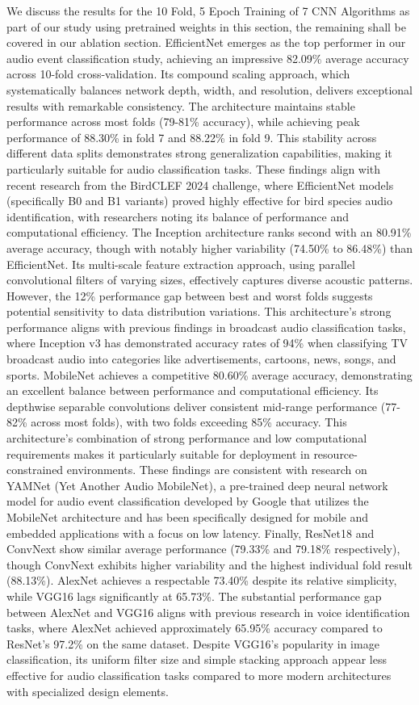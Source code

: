 \documentclass[11pt]{article}
\begin{document}
We discuss the results for the 10 Fold, 5 Epoch Training of 7 CNN Algorithms as part of our study using pretrained weights in this section, the remaining shall be covered in our ablation section. 
EfficientNet emerges as the top performer in our audio event classification study, achieving an impressive 82.09\% average accuracy across 10-fold cross-validation. Its compound scaling approach, which systematically balances network depth, width, and resolution, delivers exceptional results with remarkable consistency. The architecture maintains stable performance across most folds (79-81\% accuracy), while achieving peak performance of 88.30\% in fold 7 and 88.22\% in fold 9. This stability across different data splits demonstrates strong generalization capabilities, making it particularly suitable for audio classification tasks. These findings align with recent research from the BirdCLEF 2024 challenge, where EfficientNet models (specifically B0 and B1 variants) proved highly effective for bird species audio identification, with researchers noting its balance of performance and computational efficiency.
The Inception architecture ranks second with an 80.91\% average accuracy, though with notably higher variability (74.50\% to 86.48\%) than EfficientNet. Its multi-scale feature extraction approach, using parallel convolutional filters of varying sizes, effectively captures diverse acoustic patterns. However, the 12\% performance gap between best and worst folds suggests potential sensitivity to data distribution variations. This architecture's strong performance aligns with previous findings in broadcast audio classification tasks, where Inception v3 has demonstrated accuracy rates of 94\% when classifying TV broadcast audio into categories like advertisements, cartoons, news, songs, and sports.
MobileNet achieves a competitive 80.60\% average accuracy, demonstrating an excellent balance between performance and computational efficiency. Its depthwise separable convolutions deliver consistent mid-range performance (77-82\% across most folds), with two folds exceeding 85\% accuracy. This architecture's combination of strong performance and low computational requirements makes it particularly suitable for deployment in resource-constrained environments. These findings are consistent with research on YAMNet (Yet Another Audio MobileNet), a pre-trained deep neural network model for audio event classification developed by Google that utilizes the MobileNet architecture and has been specifically designed for mobile and embedded applications with a focus on low latency.
Finally, ResNet18 and ConvNext show similar average performance (79.33\% and 79.18\% respectively), though ConvNext exhibits higher variability and the highest individual fold result (88.13\%). AlexNet achieves a respectable 73.40\% despite its relative simplicity, while VGG16 lags significantly at 65.73\%. The substantial performance gap between AlexNet and VGG16 aligns with previous research in voice identification tasks, where AlexNet achieved approximately 65.95\% accuracy compared to ResNet's 97.2\% on the same dataset. Despite VGG16's popularity in image classification, its uniform filter size and simple stacking approach appear less effective for audio classification tasks compared to more modern architectures with specialized design elements.
\end{document}
